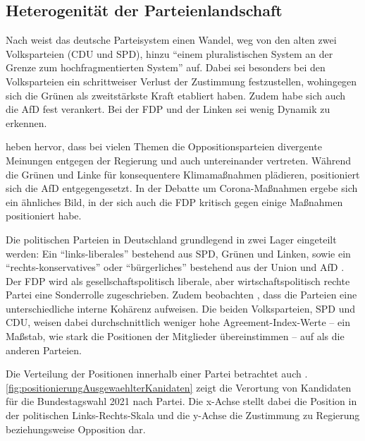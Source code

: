 \subsection{Heterogenität der Parteienlandschaft} \label{subsec:heterogenitätParteien}

Nach \textcite{niedermayer_entwicklung_2020} weist das deutsche Parteisystem einen Wandel, weg von den alten zwei Volksparteien (\ac{CDU} und \ac{SPD}), hinzu \enquote{einem pluralistischen System an der Grenze zum hochfragmentierten System} auf. Dabei sei besonders bei den Volksparteien ein schrittweiser Verlust der Zustimmung festzustellen, wohingegen sich die Grünen als zweitstärkste Kraft etabliert haben. Zudem habe sich auch die \ac{AfD} fest verankert. Bei der \ac{FDP} und der Linken sei wenig Dynamik zu erkennen.

\textcite{engler_wettbewerb_2022} heben hervor, dass bei vielen Themen die Oppositionsparteien divergente Meinungen entgegen der Regierung und auch untereinander vertreten. Während die Grünen und Linke für konsequentere Klimamaßnahmen plädieren, positioniert sich die \ac{AfD} entgegengesetzt. In der Debatte um Corona-Maßnahmen ergebe sich ein ähnliches Bild, in der sich auch die \ac{FDP} kritisch gegen einige Maßnahmen positioniert habe.

Die politischen Parteien in Deutschland grundlegend in zwei Lager eingeteilt werden: Ein \enquote{links-liberales} bestehend aus \ac{SPD}, Grünen und Linken, sowie ein \enquote{rechts-konservatives} oder \enquote{bürgerliches} bestehend aus der Union und \ac{AfD} \autocite{thomeczek_politische_2019}. Der \ac{FDP} wird als gesellschaftspolitisch liberale, aber wirtschaftspolitisch rechte Partei eine Sonderrolle zugeschrieben. Zudem beobachten \textcite{thomeczek_politische_2019}, dass die Parteien eine unterschiedliche interne Kohärenz aufweisen. Die beiden Volksparteien, \ac{SPD} und \ac{CDU}, weisen dabei durchschnittlich weniger hohe Agreement-Index-Werte -- ein Maßstab, wie stark die Positionen der Mitglieder übereinstimmen -- auf als die anderen Parteien.

Die Verteilung der Positionen innerhalb einer Partei betrachtet auch \textcite{saltzer_bundestagswahl_2022}. \autoref{fig:positionierungAusgewaehlterKanidaten} zeigt die Verortung von Kandidaten für die Bundestagswahl \num{2021} nach Partei. Die x-Achse stellt dabei die Position in der politischen Links-Rechts-Skala und die y-Achse die Zustimmung zu Regierung beziehungsweise Opposition dar.


